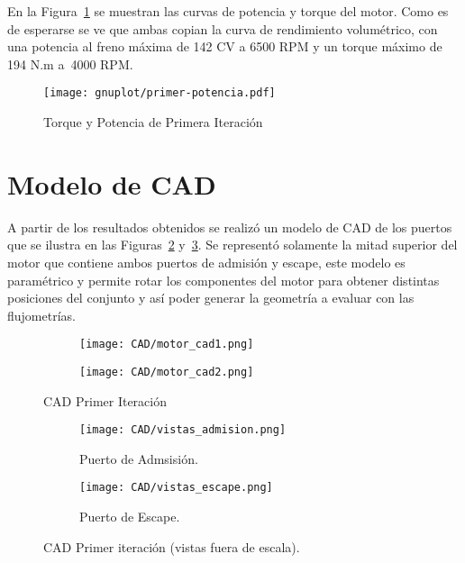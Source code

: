En la Figura~\ref{fig:PoTi_primer_op} se muestran las curvas de potencia y
torque del motor.
%
Como es de esperarse se ve que ambas copian la curva de rendimiento volumétrico,
con una potencia al freno máxima de 142 CV a 6500 RPM y un torque máximo de 194
N.m a\ 4000 RPM.

\begin{figure}[ht]
  \centering
  \texttt{[image: gnuplot/primer-potencia.pdf]}
  \caption{Torque y Potencia de Primera Iteración} \label{fig:PoTi_primer_op}
\end{figure}


\section{Modelo de CAD}
%
A partir de los resultados obtenidos se realizó un modelo de CAD de los puertos
que se ilustra en las Figuras~\ref{fig:motor_cad1} y~\ref{fig:motor_cad2}.
%
Se representó solamente la mitad superior del motor que contiene ambos puertos
de admisión y escape, este modelo es paramétrico y permite rotar los componentes
del motor para obtener distintas posiciones del conjunto y así poder generar la
geometría a evaluar con las flujometrías.


\begin{figure}[ht]
  \centering
    \begin{subfigure}{0.4\textwidth}
        \centering
        \texttt{[image: CAD/motor\_cad1.png]}
    \end{subfigure}
    \hfill
    \begin{subfigure}{0.4\textwidth}
        \centering
        \texttt{[image: CAD/motor\_cad2.png]}
    \end{subfigure}
  \caption{CAD Primer Iteración}\label{fig:motor_cad1}
\end{figure}


\begin{figure}[ht]
  \centering
    \begin{subfigure}{0.8\textwidth}
        \centering
        \texttt{[image: CAD/vistas\_admision.png]}
        \caption{Puerto de Admsisión.}
    \end{subfigure}
    \begin{subfigure}{0.8\textwidth}
        \centering
        \texttt{[image: CAD/vistas\_escape.png]}
        \caption{Puerto de Escape.}
    \end{subfigure}
  \caption{CAD Primer iteración (vistas fuera de escala).}\label{fig:motor_cad2}
\end{figure}

